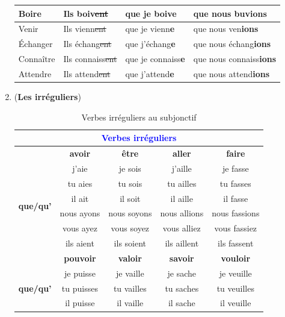 \documentclass[math,code]{amznotes}
\theoremstyle{remark}
\begin{document}
\begin{enumerate}
\begin{table}[h]
\begin{tabular}{|l|l|l|l|}
        Boire & Ils boiv\sout{ent} & que je boiv\textbf{e} & que nous buv\textbf{ions} \\
        \hline
        Venir & Ils vienn\sout{ent} & que je vienn\textbf{e} & que nous ven\textbf{ions} \\
        \hline
        Échanger & Ils échang\sout{ent} & que j'échang\textbf{e} & que nous échang\textbf{ions} \\
        \hline
        Connaître & Ils connaiss\sout{ent} & que je connaiss\textbf{e} & que nous connaiss\textbf{ions} \\
        \hline
        Attendre & Ils attend\sout{ent} & que j'attend\textbf{e} & que nous attend\textbf{ions} \\
        \hline
    \end{tabular}
    \end{table}
    \item (\textbf{Les irréguliers})
    \begin{center}
    \begin{longtable}{|c|c|c|c|c|}
    \caption{Verbes irréguliers au subjonctif} \\
    \hline
    \multicolumn{5}{|c|}{\textbf{\textcolor{blue}{Verbes irréguliers}}} \\
    \hline
    & \textbf{avoir} & \textbf{être} & \textbf{aller} & \textbf{faire} \\
    \hline
    \multirow{6}{*}{\textbf{que/qu'}} 
    & j'aie & je sois & j'aille & je fasse \\
    \cline{2-5}
    & tu aies & tu sois & tu ailles & tu fasses \\
    \cline{2-5}
    & il ait & il soit & il aille & il fasse \\
    \cline{2-5}
    & nous ayons & nous soyons & nous allions & nous fassions \\
    \cline{2-5}
    & vous ayez & vous soyez & vous alliez & vous fassiez \\
    \cline{2-5}
    & ils aient & ils soient & ils aillent & ils fassent \\
    \hline
    & \textbf{pouvoir} & \textbf{valoir} & \textbf{savoir} & \textbf{vouloir} \\
    \hline
    \multirow{6}{*}{\textbf{que/qu'}} 
    & je puisse & je vaille & je sache & je veuille \\
    \cline{2-5}
    & tu puisses & tu vailles & tu saches & tu veuilles \\
    \cline{2-5}
    & il puisse & il vaille & il sache & il veuille \\

\end{longtable}
\end{center}
\end{enumerate}
\end{document}

